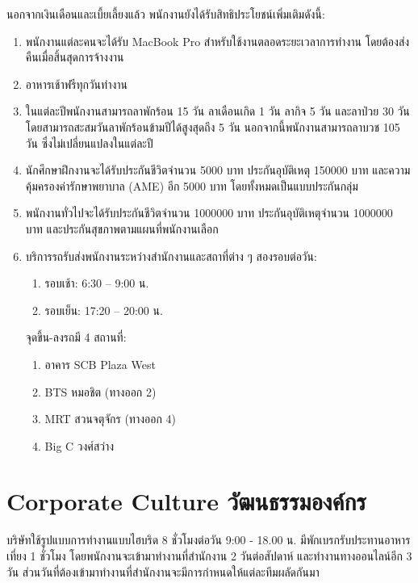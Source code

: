 นอกจากเงินเดือนและเบี้ยเลี้ยงแล้ว พนักงานยังได้รับสิทธิประโยชน์เพิ่มเติมดังนี้:
\begin{enumerate}
    \item พนักงานแต่ละคนจะได้รับ MacBook Pro สำหรับใช้งานตลอดระยะเวลาการทำงาน โดยต้องส่งคืนเมื่อสิ้นสุดการจ้างงาน
    \item อาหารเช้าฟรีทุกวันทำงาน
    \item ในแต่ละปีพนักงานสามารถลาพักร้อน 15 วัน ลาเดือนเกิด 1 วัน ลากิจ 5 วัน และลาป่วย 30 วัน โดยสามารถสะสมวันลาพักร้อนข้ามปีได้สูงสุดถึง 5 วัน นอกจากนี้พนักงานสามารถลาบวช 105 วัน ซึ่งไม่เปลี่ยนแปลงในแต่ละปี
    \item นักศึกษาฝึกงานจะได้รับประกันชีวิตจำนวน 5000 บาท ประกันอุบัติเหตุ 150000 บาท และความคุ้มครองค่ารักษาพยาบาล (AME) อีก 5000 บาท โดยทั้งหมดเป็นแบบประกันกลุ่ม
    \item พนักงานทั่วไปจะได้รับประกันชีวิตจำนวน 1000000 บาท ประกันอุบัติเหตุจำนวน 1000000 บาท และประกันสุขภาพตามแผนที่พนักงานเลือก
    \item บริการรถรับส่งพนักงานระหว่างสำนักงานและสถาที่ต่าง ๆ สองรอบต่อวัน:
    \begin{enumerate}
        \item รอบเช้า: 6:30 – 9:00 น.
        \item รอบเย็น: 17:20 – 20:00 น.
    \end{enumerate}
    จุดขึ้น-ลงรถมี 4 สถานที่:
    \begin{enumerate}
        \item อาคาร SCB Plaza West
        \item BTS หมอชิต (ทางออก 2)
        \item MRT สวนจตุจักร (ทางออก 4)
        \item Big C วงศ์สว่าง
    \end{enumerate}
\end{enumerate}


\section{\ifenglish Corporate Culture \else วัฒนธรรมองค์กร \fi} 
บริษัทใช้รูปแบบการทำงานแบบไฮบริด 8 ชั่วโมงต่อวัน 9:00 - 18.00 น. มีพักเบรกรับประทานอาหารเที่ยง 1 ชั่วโมง โดยพนักงานจะเข้ามาทำงานที่สำนักงาน 2 วันต่อสัปดาห์ และทำงานทางออนไลน์อีก 3 วัน ส่วนวันที่ต้องเข้ามาทำงานที่สำนักงานจะมีการกำหนดให้แต่ละทีมผลัดกันมา

